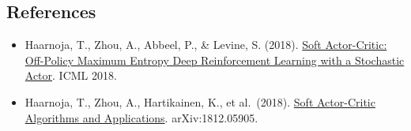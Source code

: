 \FloatBarrier
{}
\hypertarget{references-61}{%
\subsection{References}\label{references-61}}

\vspace{0.25em}
\begin{itemize}
\tightlist
\item
  Haarnoja, T., Zhou, A., Abbeel, P., \& Levine, S. (2018). \href{https://arxiv.org/abs/1801.01290}{Soft Actor-Critic: Off-Policy Maximum Entropy Deep Reinforcement Learning with a Stochastic Actor}. ICML 2018.
\item
  Haarnoja, T., Zhou, A., Hartikainen, K., et al.~(2018). \href{https://arxiv.org/abs/1812.05905}{Soft Actor-Critic Algorithms and Applications}. arXiv:1812.05905.
\end{itemize}

\clearpage
